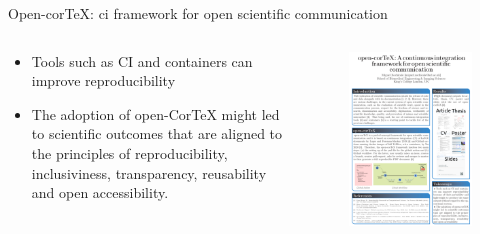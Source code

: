 {
    \begin{frame}{Open-corTeX: ci framework for open scientific communication}

  \begin{columns}
    \begin{column}{.4\linewidth}
      \begin{itemize}
        \item Tools such as CI and containers can improve reproducibility
        \item The adoption of open-CorTeX might led to scientific outcomes 
	that are aligned to the principles of reproducibility, 
	inclusiviness, transparency, reusability and open accessibility.
      \end{itemize}
    \end{column}

  \begin{column}{.6\linewidth}
      \begin{figure}
        \includegraphics[scale=0.2]{./figs/open-cortex/versions/drawing-v00.png}
        \caption{}
      \end{figure}
    \end{column}
  \end{columns}
\end{frame}
}


